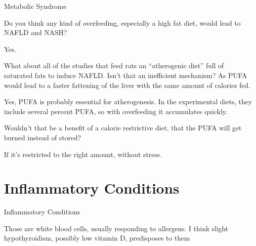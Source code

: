 \documentclass[11pt,oneside,openany,extrafontsizes]{memoir}
\begin{document}
\begin{emailexchange}{Metabolic Syndrome}

    \begin{question}
         Do you think any kind of overfeeding, especially a high fat diet, would lead to NAFLD and NASH?
    \end{question}

    \begin{answer}
      Yes.
    \end{answer}

    \begin{question}
        What about all of the studies that feed rats an \enquote{atherogenic diet} full of saturated fats to induce NAFLD. Isn't that an inefficient mechanism? As PUFA would lead to a faster fattening of the liver with the same amount of calories fed.
    \end{question}

    \begin{answer}
      Yes, PUFA is probably essential for atherogenesis. In the experimental diets, they include several percent PUFA, so with overfeeding it accumulates quickly.
    \end{answer}

    \begin{question}
        Wouldn't that be a benefit of a calorie restrictive diet, that the PUFA will get burned instead of stored?
    \end{question}

    \begin{answer}
      If it's restricted to the right amount, without stress.
    \end{answer}
\end{emailexchange}

\section{Inflammatory Conditions}

\begin{standalonequote}{Inflammatory Conditions}

    \begin{answer}
      Those are white blood cells, usually responding to allergens. I think slight hypothyroidism, possibly low vitamin D, predisposes to them
    \end{answer}
\end{standalonequote}
\end{document}
